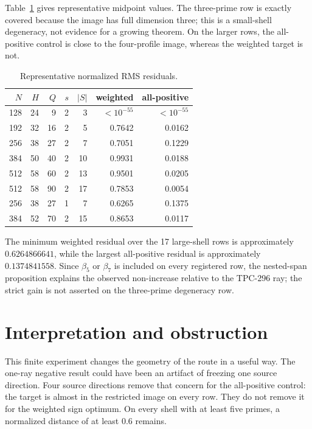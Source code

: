\documentclass[10pt]{article}
\begin{document}
Table~\ref{tab:representative} gives representative midpoint values.  The
three-prime row is exactly covered because the image has full dimension three;
this is a small-shell degeneracy, not evidence for a growing theorem.  On
the larger rows, the all-positive control is close to the four-profile image,
whereas the weighted target is not.

\begin{table}[ht]
\centering
\scriptsize
\caption{Representative normalized RMS residuals.}
\label{tab:representative}
\begin{tabular}{@{}rrrrrrr@{}}
\toprule
$N$ & $H$ & $Q$ & $s$ & $|S|$ & weighted & all-positive\\
\midrule
128&24&9 &2&3 & $<10^{-55}$ & $<10^{-55}$\\
192&32&16&2&5 &0.7642&0.0162\\
256&38&27&2&7 &0.7051&0.1229\\
384&50&40&2&10&0.9931&0.0188\\
512&58&60&2&13&0.9501&0.0205\\
512&58&90&2&17&0.7853&0.0054\\
256&38&27&1&7 &0.6265&0.1375\\
384&52&70&2&15&0.8653&0.0117\\
\bottomrule
\end{tabular}
\end{table}

The minimum weighted residual over the 17 large-shell rows is approximately
$0.6264866641$, while the largest all-positive residual is approximately
$0.1374841558$.  Since $\beta_5$ or $\beta_7$ is included on every
registered row, the nested-span proposition explains the observed
non-increase relative to the TPC-296 ray; the strict gain is not asserted on
the three-prime degeneracy row.

\section{Interpretation and obstruction}

This finite experiment changes the geometry of the route in a useful way.
The one-ray negative result could have been an artifact of freezing one
source direction.  Four source directions remove that concern for the
all-positive control: the target is almost in the restricted image on every
row.  They do not remove it for the weighted sign optimum.  On every shell
with at least five primes, a normalized distance of at least $0.6$ remains.
\end{document}
